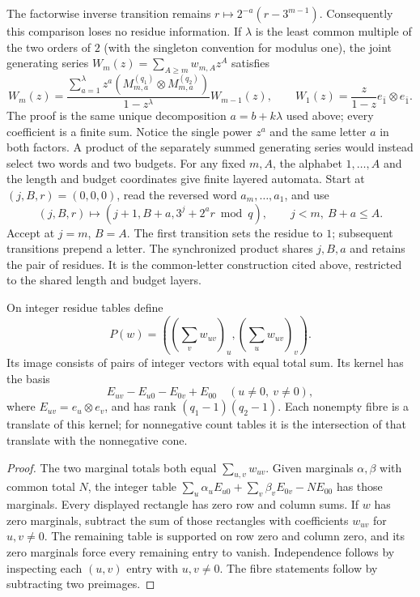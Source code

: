 The factorwise inverse transition remains
$r\mapsto2^{-a}(r-3^{m-1})$.  Consequently this comparison loses no residue
information.  If $\lambda$ is the least common multiple of the two orders
of $2$ (with the singleton convention for modulus one), the joint generating
series $W_m(z)=\sum_{A\ge m}w_{m,A}z^A$ satisfies
\[
 W_m(z)=
 \frac{\sum_{a=1}^{\lambda}z^a
    (M_{m,a}^{(q_1)}\otimes M_{m,a}^{(q_2)})}{1-z^\lambda}
 W_{m-1}(z),\qquad
 W_1(z)=\frac z{1-z}e_{\bar1}\otimes e_{\bar1}.
\]
The proof is the same unique decomposition $a=b+k\lambda$ used above;
every coefficient is a finite sum.  Notice the single power $z^a$ and the
same letter $a$ in both factors.  A product of the separately summed
generating series would instead select two words and two budgets.
For any fixed $m,A$, the alphabet $1,\ldots,A$ and the length and budget
coordinates give finite layered automata.  Start at $(j,B,r)=(0,0,0)$,
read the reversed word $a_m,\ldots,a_1$, and use
\[
 (j,B,r)\longmapsto(j+1,B+a,3^j+2^ar\bmod q),
 \qquad j<m,\ B+a\le A.
\]
Accept at $j=m$, $B=A$.  The first transition sets the residue to $1$;
subsequent transitions prepend a letter.  The synchronized product shares
$j,B,a$ and retains the pair of residues.  It is the common-letter
construction cited above, restricted to the shared length and budget layers.

\begin{proposition}
\label{prop:packet-marginal-kernel}
On integer residue tables define
\[
 P(w)=\left(\left(\sum_v w_{uv}\right)_u,
                \left(\sum_u w_{uv}\right)_v\right).
\]
Its image consists of pairs of integer vectors with equal total sum.
Its kernel has the basis
\[
 E_{uv}-E_{u0}-E_{0v}+E_{00}
 \quad(u\ne0,\ v\ne0),
\]
where $E_{uv}=e_u\otimes e_v$, and has rank $(q_1-1)(q_2-1)$.
Each nonempty fibre is a translate of this kernel; for nonnegative count
tables it is the intersection of that translate with the nonnegative cone.
\end{proposition}

\begin{proof}
The two marginal totals both equal $\sum_{u,v}w_{uv}$.  Given marginals
$\alpha,\beta$ with common total $N$, the integer table
$\sum_u\alpha_uE_{u0}+\sum_v\beta_vE_{0v}-NE_{00}$ has those marginals.
Every displayed rectangle has zero row and column sums.  If $w$ has zero
marginals, subtract the sum of those rectangles with coefficients $w_{uv}$
for $u,v\ne0$.  The remaining table is supported on row zero and column
zero, and its zero marginals force every remaining entry to vanish.
Independence follows by inspecting each $(u,v)$ entry with $u,v\ne0$.
The fibre statements follow by subtracting two preimages.
\end{proof}


